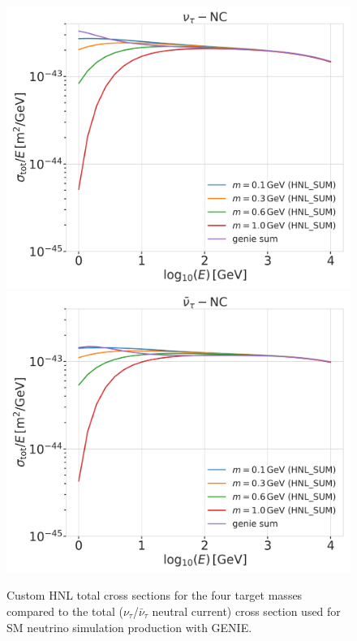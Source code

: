 \begin{figure}
    \includegraphics[width=.49\linewidth]{figures/hnl_simulation/cross_sections/custom_HNL_xsecs_final_SUM_flavorwise_total_xsecs_sigma-nutau-N-nc.png}
    \includegraphics[width=.49\linewidth]{figures/hnl_simulation/cross_sections/custom_HNL_xsecs_final_SUM_flavorwise_total_xsecs_sigma-nutaubar-N-nc.png}
    \caption{Custom HNL total cross sections for the four target masses compared to the total ($\nu_\tau$/$\bar{\nu}_\tau$ neutral current) cross section used for SM neutrino simulation production with GENIE.}
\end{figure}


